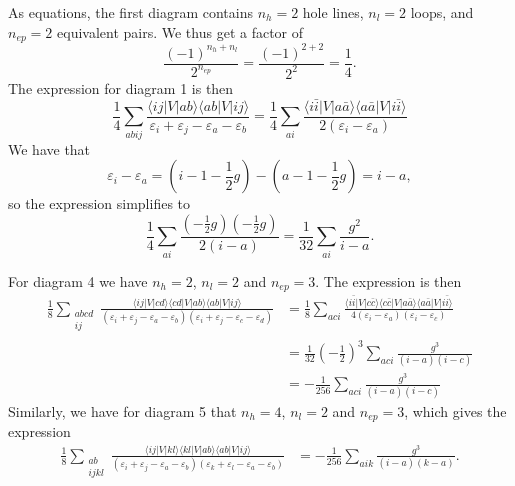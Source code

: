 As equations, the first diagram contains $n_h = 2$ hole lines, $n_l = 2$ loops, and $n_{ep} = 2$ equivalent pairs.
We thus get a factor of
\begin{equation*}
    \frac{(-1)^{n_h + n_l}}{2^{n_{ep}}} = \frac{(-1)^{2+2}}{2^2} = \frac{1}{4}.
\end{equation*}
The expression for diagram 1 is then
\begin{equation*}
    \frac{1}{4} \sum_{abij} \frac{
        \langle ij \lvert V \rvert ab \rangle
        \langle ab \lvert V \rvert ij \rangle
    }{\varepsilon_i + \varepsilon_j - \varepsilon_a - \varepsilon_b}
    =
    \frac{1}{4} \sum_{ai} \frac{
        \langle i \bar{i} \vert V \vert a \bar{a} \rangle %
        \langle a \bar{a} \vert V \vert i \bar{i} \rangle %
    }{2(\varepsilon_i - \varepsilon_a)}
\end{equation*}
We have that
\begin{equation*}
    \varepsilon_i - \varepsilon_a = \left( i - 1 - \frac{1}{2} g \right) - \left( a - 1 - \frac{1}{2} g \right) = i - a,
\end{equation*}
so the expression simplifies to
\begin{equation*}
    \frac{1}{4} \sum_{ai} \frac{
        (-\frac{1}{2} g)(-\frac{1}{2} g)
    }{2(i - a)} = \frac{1}{32} \sum_{ai} \frac{g^2}{i - a}.
\end{equation*}

For diagram 4 we have $n_h = 2$, $n_l = 2$ and $n_{ep} = 3$.
The expression is then
\begin{align*}
    \frac{1}{8} \sum_{\substack{abcd \\ ij}} \frac{
        \langle ij \vert V \vert cd \rangle
        \langle cd \vert V \vert ab \rangle
        \langle ab \vert V \vert ij \rangle
    }{
        (
            \varepsilon_i + \varepsilon_j - \varepsilon_a - \varepsilon_b
        )(
            \varepsilon_i + \varepsilon_j - \varepsilon_c - \varepsilon_d
        )
    }
    &= \frac{1}{8} \sum_{aci} \frac{
        \langle i\bar{i} \vert V \vert c\bar{c} \rangle %
        \langle c\bar{c} \vert V \vert a\bar{a} \rangle
        \langle a\bar{a} \vert V \vert i\bar{i} \rangle %
    }{
        4(
            \varepsilon_i - \varepsilon_a
        )(
            \varepsilon_i - \varepsilon_c
        )
    } \\
    &= \frac{1}{32} \left( -\frac{1}{2} \right)^3 \sum_{aci} \frac{
        g^3
    }{(i - a)(i - c)} \\
    &= -\frac{1}{256} \sum_{aci} \frac{g^3}{(i-a)(i-c)}
\end{align*}
Similarly, we have for diagram 5 that $n_h = 4$, $n_l = 2$ and $n_{ep} = 3$, which gives the expression
\begin{align*}
    \frac{1}{8} \sum_{\substack{ab \\ ijkl}} \frac{
        \langle ij \vert V \vert kl \rangle
        \langle kl \vert V \vert ab \rangle
        \langle ab \vert V \vert ij \rangle
    }{
        (
            \varepsilon_i + \varepsilon_j - \varepsilon_a - \varepsilon_b
        )(
            \varepsilon_k + \varepsilon_l - \varepsilon_a - \varepsilon_b
        )
    } &= -\frac{1}{256} \sum_{aik} \frac{g^3}{(i-a)(k-a)}.
\end{align*}

